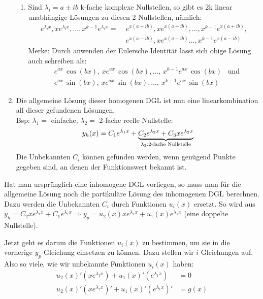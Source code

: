 \begin{enumerate}
\begin{enumerate}[leftmargin=0.3cm]
		\item Sind $\lambda_i = a \pm ib$ k-fache komplexe Nullstellen, so gibt es 2k linear unabhängige Lösungen zu diesen 2 Nullstellen, nämlich:
		{\small\begin{align*}
				e^{\lambda_i x}, x e^{\lambda_i x}, \ldots, x^{k-1} e^{\lambda_i x}
				= \; &e^{x(a+ib)}, x e^{x(a+ib)}, \ldots, x^{k-1} e^{x(a+ib)}, \\
				&e^{x(a-ib)}, x e^{x(a-ib)} \ldots, x^{k-1} e^{x(a-ib)}
		\end{align*}}Merke: Durch anwenden der Eulersche Identität lässt sich obige Lösung auch schreiben als:
		\vspace{3pt}
		\begin{align*}
			&e^{a x} \, \cos(bx), \, x e^{a x} \, \cos(bx), \ldots, \, x^{k-1} e^{a x} \, \cos(bx) \hspace{10pt} \text{und}\\
			&e^{a x} \, \sin(bx), \, x e^{a x} \, \sin(bx), \ldots, \, x^{k-1} e^{a x} \, \sin(bx)
		\end{align*}
	\end{enumerate}
	\vspace{3pt}
	\item Die allgemeine Lösung dieser homogenen DGL ist nun eine linearkombination all dieser gefundenen Lösungen. \\
	Bsp: $\lambda_1 =$ einfache, $\lambda_2 = $ 2-fache reelle Nullstelle:
	\begin{align*}
	 y_h(x) = C_1 e^{\lambda_1 x} + \underset{\lambda_2: \text{2-fache Nullstelle}}{\underbrace{C_2 e^{\lambda_2 x} + C_3 x e^{\lambda_2 x}}}
	\end{align*}
	Die Unbekannten $C_i$ können gefunden werden, wenn genügend Punkte gegeben sind, an denen der Funktionswert bekannt ist.
\end{enumerate}


Hat man ursprünglich eine inhomogene DGL vorliegen, so muss man für die allgemeine Lösung
noch die partikuläre Lösung des inhomogenen DGL berechnen. Dazu werden die Unbekannten
$C_i$ durch Funktionen $u_i(x)$ ersetzt. So wird aus
$y_h = C_2 x e^{\lambda_1 x} + C_1 e^{\lambda_1 x} \Rightarrow
y_p = u_2(x) x e^{\lambda_1 x} + u_1(x) e^{\lambda_1 x}$ (eine doppelte Nullstelle).

Jetzt geht es darum die Funktionen $u_i(x)$ zu bestimmen, um sie in die vorherige
$y_p$-Gleichung einsetzen zu können. Dazu stellen wir $i$ Gleichungen auf.
Also so viele, wie wir unbekannte Funktionen $u_i(x)$ haben:
\begin{align*}
u_2(x)' (x e^{\lambda_1 x}) + u_1(x)' (e^{\lambda_1 x}) &= 0\\
u_2(x)' (x e^{\lambda_1 x})' + u_1(x)' (e^{\lambda_1 x})' &= g(x)
\end{align*}

